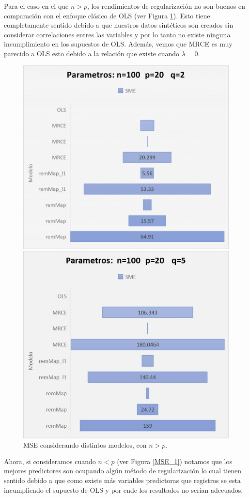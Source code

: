 \documentclass{article}
\begin{document}
Para el caso en el que $n>p$, los rendimientos de regularización no son buenos en comparación con el enfoque clásico de OLS (ver Figura \ref{R}). Esto tiene completamente sentido debido a que nuestros datos sintéticos son creados sin considerar correlaciones entres las variables y por lo tanto no existe ninguna incumplimiento en los supuestos de OLS. Además, vemos que MRCE es muy parecido a OLS esto debido a la relación que existe cuando $\lambda =0.$ 
\begin{figure}[H]
   \includegraphics[scale=.65]{figure/im3.jpg}
  \caption{}
 \endminipage
   \includegraphics[scale=.65]{figure/im4.jpg}
  \caption{}
 \endminipage
\caption{MSE considerando distintos modelos, con $n>p$.}\label{R}
\end{figure}
Ahora, si consideramos cuando $n<p$ (ver Figura \ref{MSE_1}) notamos que los mejores predictores son ocupando algún método de regularización lo cual tienen sentido debido a que como existe más variables predictoras que registros se esta incumpliendo el supuesto de OLS y por ende los resultados no serían adecuados.
\end{document}
